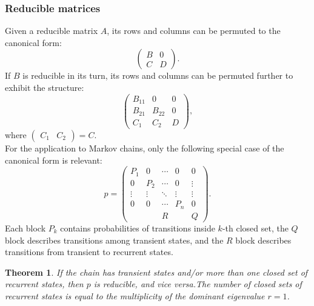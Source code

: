 \documentclass{article}
\newtheorem{theorem}{Theorem}
\begin{document}
\subsubsection{Reducible matrices}
Given a reducible matrix $A$, its rows and columns can be permuted to the canonical form:
\begin{equation}
    \begin{pmatrix}
        B & 0 \\ C & D
    \end{pmatrix}. \nonumber
\end{equation}
If $B$ is reducible in its turn, its rows and columns can be permuted further to exhibit the structure:
\begin{equation}
    \begin{pmatrix}
        B_{11} & 0 & 0 \\ B_{21} & B_{22} & 0 \\ C_1 & C_2 & D
    \end{pmatrix},
\end{equation}
where $\begin{pmatrix}
    C_1 & C_2
\end{pmatrix} = C$.\\
For the application to Markov chains, only the following special case of the canonical form is relevant:
\begin{equation}
p = 
    \begin{pmatrix}
        P_1 & 0 & \cdots & 0 & 0 \\
        0 & P_2 & \cdots & 0 & \vdots \\
        \vdots & \vdots & \ddots & \vdots & \vdots \\
        0 & 0 & \cdots & P_n & 0 \\
         &  & R &  & Q
    \end{pmatrix}.
\end{equation}
Each block $P_k$ contains probabilities of transitions inside $k$-th closed set, the $Q$ block describes transitions among transient states, and the $R$ block describes transitions from transient to recurrent states.
\begin{theorem}
    If the chain has transient states and/or more than one closed set of recurrent states, then $p$ is reducible, and vice versa.The number of closed sets of recurrent states is equal to the multiplicity of the dominant eigenvalue $r=1$.
\end{theorem}
\end{document}
